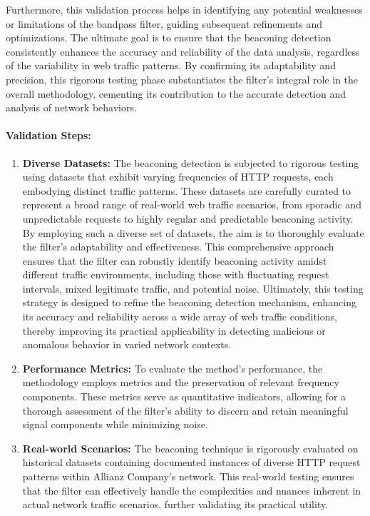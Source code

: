 Furthermore, this validation process helps in identifying any potential weaknesses or limitations of the bandpass filter, guiding subsequent refinements and optimizations. The ultimate goal is to ensure that the beaconing detection consistently enhances the accuracy and reliability of the data analysis, regardless of the variability in web traffic patterns. By confirming its adaptability and precision, this rigorous testing phase substantiates the filter's integral role in the overall methodology, cementing its contribution to the accurate detection and analysis of network behaviors.

\paragraph{Validation Steps:}
\begin{enumerate}
    \item \textbf{Diverse Datasets:} The beaconing detection is subjected to rigorous testing using datasets that exhibit varying frequencies of HTTP requests, each embodying distinct traffic patterns. These datasets are carefully curated to represent a broad range of real-world web traffic scenarios, from sporadic and unpredictable requests to highly regular and predictable beaconing activity. By employing such a diverse set of datasets, the aim is to thoroughly evaluate the filter's adaptability and effectiveness. This comprehensive approach ensures that the filter can robustly identify beaconing activity amidst different traffic environments, including those with fluctuating request intervals, mixed legitimate traffic, and potential noise. Ultimately, this testing strategy is designed to refine the beaconing detection mechanism, enhancing its accuracy and reliability across a wide array of web traffic conditions, thereby improving its practical applicability in detecting malicious or anomalous behavior in varied network contexts.
    \item \textbf{Performance Metrics:} To evaluate the method's performance, the methodology employs metrics and the preservation of relevant frequency components. These metrics serve as quantitative indicators, allowing for a thorough assessment of the filter's ability to discern and retain meaningful signal components while minimizing noise.
    \item \textbf{Real-world Scenarios:} The beaconing technique is rigorously evaluated on historical datasets containing documented instances of diverse HTTP request patterns within Allianz Company's network. This real-world testing ensures that the filter can effectively handle the complexities and nuances inherent in actual network traffic scenarios, further validating its practical utility.
\end{enumerate}

